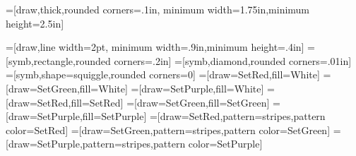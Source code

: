 \documentclass[letterpaper]{article}
\begin{document}
\newcommand{\patlen}{.04in}
{\pgfpointorigin}{\pgfpoint{\patlen}{\patlen}}
{\pgfpoint{\patlen}{\patlen}}
{
  \pgfpathlineto{\pgfpoint{0}{\patlen}}
  \pgfpathlineto{\pgfpoint{.2*\patlen}{\patlen}}
  \pgfpathlineto{\pgfpoint{.2*\patlen}{0}}
  \pgfpathclose%
}

\makeatletter
{}
\makeatother


=[draw,thick,rounded corners=.1in,
  minimum width=1.75in,minimum height=2.5in]

=[draw,line width=2pt,
  minimum width=.9in,minimum height=.4in]
=[symb,rectangle,rounded corners=.2in]
=[symb,diamond,rounded corners=.01in]
=[symb,shape=squiggle,rounded corners=0]
=[draw=SetRed,fill=White]
=[draw=SetGreen,fill=White]
=[draw=SetPurple,fill=White]
=[draw=SetRed,fill=SetRed]
=[draw=SetGreen,fill=SetGreen]
=[draw=SetPurple,fill=SetPurple]
=[draw=SetRed,pattern=stripes,pattern color=SetRed]
=[draw=SetGreen,pattern=stripes,pattern color=SetGreen]
=[draw=SetPurple,pattern=stripes,pattern color=SetPurple]
\end{document}

